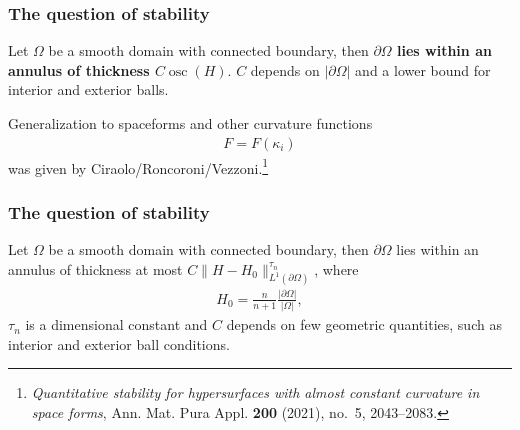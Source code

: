 \documentclass{beamer}
\newcommand{\bbR}{\mathbb{R}}
\newcommand{\8}{\infty}
\newcommand{\ka}{\kappa}
\newcommand{\Om}{\Omega}
\newcommand{\del}{\partial}
\newcommand{\fr}[2]{\frac{#1}{#2}}
\DeclareMathOperator{\osc}{osc}
\newcommand{\eq}[1]{\begin{equation}\begin{alignedat}{2} #1 \end{alignedat}\end{equation}}
\newcommand{\abs}[1]{\lvert #1\rvert}
\begin{document}
\begin{frame} 
\frametitle{The question of stability}

\begin{theorem}
Let $\Om$ be a smooth domain with connected boundary, then {\bf{$\del\Om$ lies within an annulus of thickness $C\osc(H)$}}. $C$ depends on $\abs{\del\Om}$ and a lower bound for interior and exterior balls.
\end{theorem}


 Generalization to spaceforms and other curvature functions
\eq{F=F(\ka_{i})}
was given by Ciraolo/Roncoroni/Vezzoni.\footnote{\emph{Quantitative
  stability for hypersurfaces with almost constant curvature in space forms},
  Ann. Mat. Pura Appl. \textbf{200} (2021), no.~5, 2043--2083.}


\end{frame}




\begin{frame} 
\frametitle{The question of stability}

\begin{theorem}
Let $\Om$ be a smooth domain with connected boundary, then $\del\Om$ lies within an annulus of thickness at most $C\|H-H_{0}\|_{L^{1}(\del\Om)}^{\tau_{n}}$, where
\eq{H_{0} = \fr{n}{n+1}\fr{\abs{\del\Om}}{\abs{\Om}},}
 $\tau_{n}$ is a dimensional constant and $C$ depends on few geometric quantities, such as interior and exterior ball conditions.

\end{theorem}
\end{frame}
\end{document}
